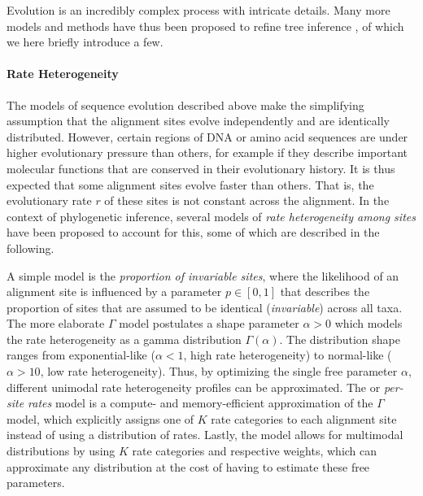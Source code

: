 Evolution is an incredibly complex process with intricate details.
Many more models and methods have thus been proposed to refine tree inference \cite{Yang2014},
of which we here briefly introduce a few.

\paragraph{Rate Heterogeneity}
\label{ch:Foundations:sec:MLTreeInference:sub:FurtherAspects:par:RateHeterogeneity}

The models of sequence evolution described above make the simplifying assumption
that the alignment sites evolve independently and are identically distributed.
However, certain regions of DNA or amino acid sequences are under higher evolutionary pressure than others,
for example if they describe important molecular functions that are conserved in their evolutionary history.
It is thus expected that some alignment sites evolve faster than others.
That is, the evolutionary rate $r$ of these sites is not constant across the alignment.
In the context of phylogenetic inference,
several models of \emph{rate heterogeneity among sites} have been proposed to account for this,
some of which are described in the following.

A simple model is the \emph{proportion of invariable sites},
where the likelihood of an alignment site is influenced by a parameter $p \in [0,1]$
that describes the proportion of sites that are assumed to be identical (\emph{invariable}) across all taxa.
The more elaborate $\Gamma$ model \cite{Yang1994a} postulates a shape parameter $\alpha > 0$
which models the rate heterogeneity as a gamma distribution $\Gamma(\alpha)$.
The distribution shape ranges from exponential-like ($\alpha < 1$, high rate heterogeneity)
to normal-like ($\alpha > 10$, low rate heterogeneity).
Thus, by optimizing the single free parameter $\alpha$,
different unimodal rate heterogeneity profiles can be approximated.
The  or \emph{per-site rates} model \cite{Stamatakis2006a}
is a compute- and memory-efficient approximation of the $\Gamma$ model,
which explicitly assigns one of $K$ rate categories to each alignment site instead of using a distribution of rates.
Lastly, the  model \cite{Yang1995} allows for multimodal distributions
by using $K$ rate categories and respective weights,
which can approximate any distribution at the cost of having to estimate these free parameters.

